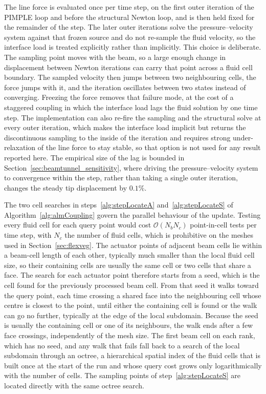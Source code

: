 \noindent
The line force is evaluated once per time step, on the first outer iteration of the PIMPLE loop and before the structural Newton loop, and is then held fixed for the remainder of the step. The later outer iterations solve the pressure--velocity system against that frozen source and do not re-sample the fluid velocity, so the interface load is treated explicitly rather than implicitly. This choice is deliberate. The sampling point moves with the beam, so a large enough change in displacement between Newton iterations can carry that point across a fluid cell boundary. The sampled velocity then jumps between two neighbouring cells, the force jumps with it, and the iteration oscillates between two states instead of converging. Freezing the force removes that failure mode, at the cost of a staggered coupling in which the interface load lags the fluid solution by one time step. The implementation can also re-fire the sampling and the structural solve at every outer iteration, which makes the interface load implicit but returns the discontinuous sampling to the inside of the iteration and requires strong under-relaxation of the line force to stay stable, so that option is not used for any result reported here. The empirical size of the lag is bounded in Section~\ref{sec:beamtunnel_sensitivity}, where driving the pressure--velocity system to convergence within the step, rather than taking a single outer iteration, changes the steady tip displacement by $0.1\%$.

\noindent
The two cell searches in steps~\ref{alg:stepLocateA} and~\ref{alg:stepLocateS} of Algorithm~\ref{alg:almCoupling} govern the parallel behaviour of the update. Testing every fluid cell for each query point would cost $\mathcal{O}(N_{b}N_{c})$ point-in-cell tests per time step, with $N_{c}$ the number of fluid cells, which is prohibitive on the meshes used in Section~\ref{sec:flexveg}. The actuator points of adjacent beam cells lie within a beam-cell length of each other, typically much smaller than the local fluid cell size, so their containing cells are usually the same cell or two cells that share a face. The search for each actuator point therefore starts from a seed, which is the cell found for the previously processed beam cell. From that seed it walks toward the query point, each time crossing a shared face into the neighbouring cell whose centre is closest to the point, until either the containing cell is found or the walk can go no further, typically at the edge of the local subdomain. Because the seed is usually the containing cell or one of its neighbours, the walk ends after a few face crossings, independently of the mesh size. The first beam cell on each rank, which has no seed, and any walk that fails fall back to a search of the local subdomain through an octree, a hierarchical spatial index of the fluid cells that is built once at the start of the run and whose query cost grows only logarithmically with the number of cells. The sampling points of step~\ref{alg:stepLocateS} are located directly with the same octree search.


